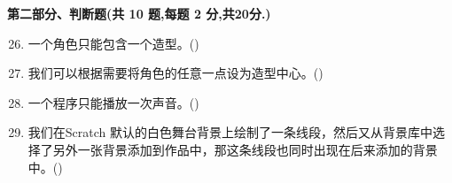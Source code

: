 \documentclass[10pt, a4paper]{article}
\begin{document}
    \newpage
    {\noindent\textbf{第二部分、判断题(共 10 题,每题 2 分,共20分.)}}
    \begin{enumerate}
        \setcounter{enumi}{25}
        \item 一个角色只能包含一个造型。(\qquad)

        \item 我们可以根据需要将角色的任意一点设为造型中心。(\qquad)

        \item 一个程序只能播放一次声音。(\qquad)

        \item 我们在Scratch 默认的白色舞台背景上绘制了一条线段，然后又从背景库中选择了另外一张背景添加到作品中，那这条线段也同时出现在后来添加的背景中。(\qquad)


\end{enumerate}
\end{document}
